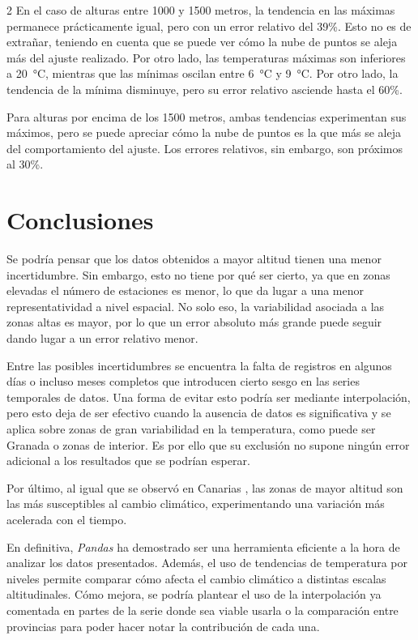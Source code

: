 \documentclass[a4paper]{article}
\numberwithin{equation}{section}
\begin{document}
\begin{multicols}{2}
	En el caso de alturas entre 1000 y 1500 metros, la tendencia en las máximas permanece prácticamente igual, pero con un error relativo del 39\%. Esto no es de extrañar, teniendo en cuenta que se puede ver cómo la nube de puntos se aleja más del ajuste realizado. Por otro lado, las temperaturas máximas son inferiores a \SI{20}{\degreeCelsius}, mientras que las mínimas oscilan entre \SI{6}{\degreeCelsius} y \SI{9}{\degreeCelsius}. Por otro lado, la tendencia de la mínima disminuye, pero su error relativo asciende hasta el 60\%.

	Para alturas por encima de los 1500 metros, ambas tendencias experimentan sus máximos, pero se puede apreciar cómo la nube de puntos es la que más se aleja del comportamiento del ajuste. Los errores relativos, sin embargo, son próximos al 30\%.
	\section{Conclusiones}
	Se podría pensar que los datos obtenidos a mayor altitud tienen una menor incertidumbre. Sin embargo, esto no tiene por qué ser cierto, ya que en zonas elevadas el número de estaciones es menor, lo que da lugar a una menor representatividad a nivel espacial. No solo eso, la variabilidad asociada a las zonas altas es mayor, por lo que un error absoluto más grande puede seguir dando lugar a un error relativo menor.

	Entre las posibles incertidumbres se encuentra la falta de registros en algunos días o incluso meses completos que introducen cierto sesgo en las series temporales de datos. Una forma de evitar esto podría ser mediante interpolación, pero esto deja de ser efectivo cuando la ausencia de datos es significativa y se aplica sobre zonas de gran variabilidad en la temperatura, como puede ser Granada o zonas de interior. Es por ello que su exclusión no supone ningún error adicional a los resultados que se podrían esperar.

	Por último, al igual que se observó en Canarias \cite{carrillo2023uneven}, las zonas de mayor altitud son las más susceptibles al cambio climático, experimentando una variación más acelerada con el tiempo.

	En definitiva, \textit{Pandas} ha demostrado ser una herramienta eficiente a la hora de analizar los datos presentados. Además, el uso de tendencias de temperatura por niveles permite comparar cómo afecta el cambio climático a distintas escalas altitudinales. Cómo mejora, se podría plantear el uso de la interpolación ya comentada en partes de la serie donde sea viable usarla o la comparación entre provincias para poder hacer notar la contribución de cada una.
\end{multicols}

\printbibliography
\end{document}
